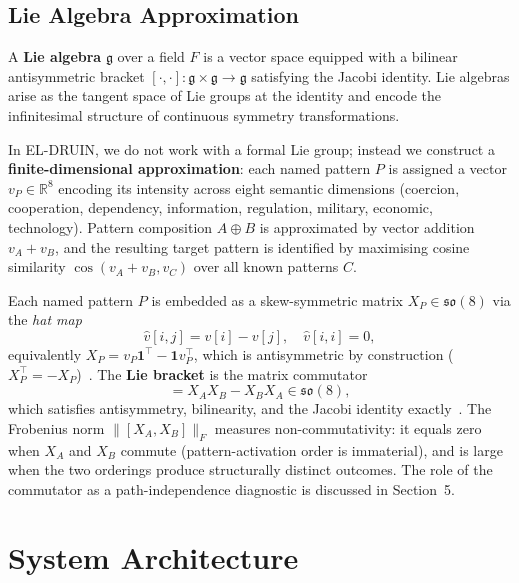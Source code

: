 \documentclass{llncs}
\begin{document}
\subsection{Lie Algebra Approximation}

A \textbf{Lie algebra} $\mathfrak{g}$ over a field $F$ is a vector space equipped
with a bilinear antisymmetric bracket
$[\cdot, \cdot] \colon \mathfrak{g} \times \mathfrak{g} \to \mathfrak{g}$
satisfying the Jacobi identity. Lie algebras arise as the tangent space
of Lie groups at the identity and encode the infinitesimal structure of
continuous symmetry transformations.

In EL-DRUIN, we do not work with a formal Lie group; instead we
construct a \textbf{finite-dimensional approximation}: each named pattern $P$
is assigned a vector $v_P \in \mathbb{R}^8$ encoding its intensity across
eight semantic dimensions (coercion, cooperation, dependency,
information, regulation, military, economic, technology). Pattern
composition $A \oplus B$ is approximated by vector addition $v_A + v_B$,
and the resulting target pattern is identified by maximising cosine
similarity $\cos(v_A + v_B, v_C)$ over all known patterns $C$.

Each named pattern $P$ is embedded as a skew-symmetric matrix
$X_P \in \mathfrak{so}(8)$ via the \emph{hat map}
\begin{equation}
  \hat{v}[i,j] = v[i] - v[j], \quad \hat{v}[i,i] = 0,
  \label{eq:hatmap}
\end{equation}
equivalently $X_P = v_P \mathbf{1}^\top - \mathbf{1} v_P^\top$, which is
antisymmetric by construction ($X_P^\top = -X_P$)~\cite{hall2015}.
The \textbf{Lie bracket} is the matrix commutator
\begin{equation}
  [X_A, X_B] = X_A X_B - X_B X_A \in \mathfrak{so}(8),
  \label{eq:liebracket}
\end{equation}
which satisfies antisymmetry, bilinearity, and the Jacobi identity
exactly~\cite{humphreys1972,hall2015}. The Frobenius norm
$\|[X_A, X_B]\|_F$ measures non-commutativity: it equals zero when
$X_A$ and $X_B$ commute (pattern-activation order is immaterial), and is
large when the two orderings produce structurally distinct outcomes.
The role of the commutator as a path-independence diagnostic is discussed
in Section~5.

\section{System Architecture}
\end{document}
